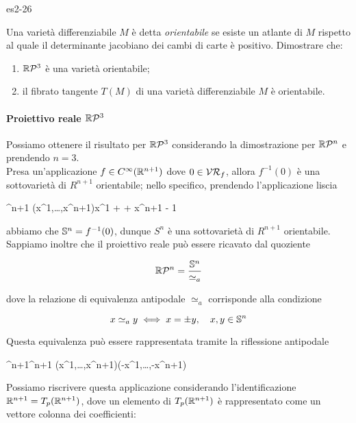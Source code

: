 
{es2-26}
{
Una varietà differenziabile $ M $ è detta \textit{orientabile} se esiste un atlante di $ M $ rispetto al quale il determinante jacobiano dei cambi di carte è positivo. Dimostrare che:

\begin{enumerate}
	\item $ \rp{3} $ è una varietà orientabile;
	\item il fibrato tangente $ T(M) $ di una varietà differenziabile $ M $ è orientabile.
\end{enumerate}
}
{
\paragraph{Proiettivo reale $ \rp{3} $}

Possiamo ottenere il risultato per $ \rp{3} $ considerando la dimostrazione per $ \rp{n} $ e prendendo $ n = 3 $. \\
Presa un'applicazione $ f \in C^{\infty}(\R^{n+1}) $ dove $ 0 \in \VR_{f} $, allora $ f^{-1}(0) $ è una sottovarietà di $ R^{n+1} $ orientabile; nello specifico, prendendo  l'applicazione liscia

	{\R^{n+1}}{\R}
	{(x^{1},\dots,x^{n+1})}{x^{1} + \cdots + x^{n+1} - 1}

abbiamo che $ \S^{n} = f^{-1}(0) $, dunque $ S^{n} $ è una sottovarietà di $ R^{n+1} $ orientabile. \\
Sappiamo inoltre che il proiettivo reale può essere ricavato dal quoziente

\begin{equation}
	\rp{n} = \dfrac{\S^{n}}{\simeq_{a}}
\end{equation}

dove la relazione di equivalenza antipodale $ \simeq_{a} $ corrisponde alla condizione

\begin{equation}
	x \simeq_{a} y \iff x = \pm y \qcomma x,y \in \S^{n}
\end{equation}

Questa equivalenza può essere rappresentata tramite la riflessione antipodale

	{\R^{n+1}}{\R^{n+1}}
	{(x^{1},\dots,x^{n+1})}{(-x^{1},\dots,-x^{n+1})}

Possiamo riscrivere questa applicazione considerando l'identificazione $ \R^{n+1} = T_{p}(\R^{n+1}) $, dove un elemento di $ T_{p}(\R^{n+1}) $ è rappresentato come un vettore colonna dei coefficienti:

}
